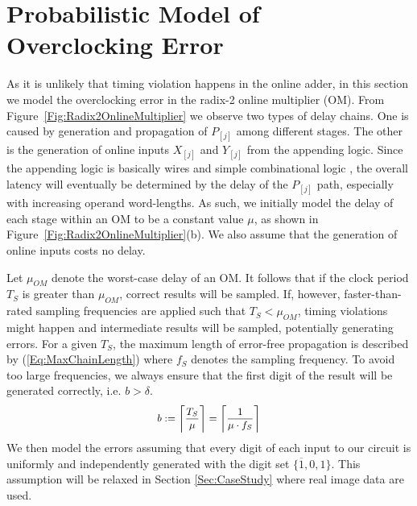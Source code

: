 \documentclass{acm_proc_article-sp}
\begin{document}
\section{Probabilistic Model of\\Overclocking Error}
As it is unlikely that timing violation happens in the online adder, in this section we model the overclocking error in the radix-2 online multiplier (OM). From Figure~\ref{Fig:Radix2OnlineMultiplier} we observe two types of delay chains. One is caused by generation and propagation of $P_{[j]}$ among different stages. The other is the generation of online inputs $X_{[j]}$ and $Y_{[j]}$ from the appending logic. Since the appending logic is basically wires and simple combinational logic \cite{Online_Conversion}, the overall latency will eventually be determined by the delay of the $P_{[j]}$ path, especially with increasing operand word-lengths. As such, we initially model the delay of each stage within an OM to be a constant value $\mu$, as shown in Figure~\ref{Fig:Radix2OnlineMultiplier}(b). We also assume that the generation of online inputs costs no delay.\vspace{-1ex}

Let $\mu_{OM}$ denote the worst-case delay of an OM. It follows that if the clock period $T_S$ is greater than $\mu_{OM}$, correct results will be sampled. If, however, faster-than-rated sampling frequencies are applied such that $T_S<\mu_{OM}$, timing violations might happen and intermediate results will be sampled, potentially generating errors. For a given $T_S$, the maximum length of error-free propagation is described by (\ref{Eq:MaxChainLength}) where $f_S$ denotes the sampling frequency. To avoid too large frequencies, we always ensure that the first digit of the result will be generated correctly, i.e. $b>\delta$.
%
\begin{eqnarray}\label{Eq:MaxChainLength}
\footnotesize
  b:=\left\lceil \frac{T_S}{\mu} \right\rceil=\left\lceil \frac{1}{\mu\cdot f_S}\right\rceil
\normalsize
\end{eqnarray}
%
We then model the errors assuming that every digit of each input to our circuit is uniformly and independently generated with the digit set $\{\overline{1},0,1\}$. This assumption will be relaxed in Section \ref{Sec:CaseStudy} where real image data are used.
\end{document}
